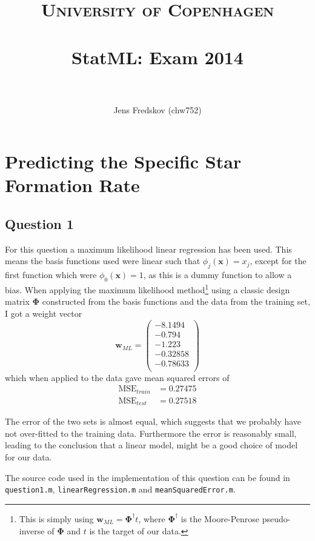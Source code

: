 \documentclass[a4paper, 11pt]{article}
\title{ 
\normalfont\normalsize 
\textsc{University of Copenhagen} \\ [25pt]
\horrule{0.5pt} \\[0.4cm]
\huge StatML\@: Exam 2014\\
\horrule{2pt} \\[0.5cm]
}
\author{Jens Fredskov (chw752)}
\begin{document}
\maketitle
\pagebreak

\section{Predicting the Specific Star Formation Rate} %
\label{sec:predicting_the_specific_star_formation_rate}

\subsection*{Question 1}
For this question a maximum likelihood linear regression has been used. This means the basis functions used were linear such that $\phi_j(\mathbf{x}) = x_j$, except for the first function which were $\phi_0(\mathbf{x}) = 1$, as this is a dummy function to allow a bias. When applying the maximum likelihood method\footnote{This is simply using $\mathbf{w}_{\mathit{ML}} = \bm\Phi^\dagger t$, where $\bm\Phi^\dagger$ is the Moore-Penrose pseudo-inverse of $\bm\Phi$ and $t$ is the target of our data.} using a classic design matrix $\bm\Phi$ constructed from the basis functions and the data from the training set, I got a weight vector
\[
    \mathbf{w}_{\mathit{ML}} = \begin{pmatrix}
      -8.1494 \\
       -0.794 \\
       -1.223 \\
     -0.32858 \\
     -0.78633 \\
    \end{pmatrix}
    \label{eq:wml}
\]
which when applied to the data gave mean squared errors of
\begin{align*}
    \mathrm{MSE}_{\mathit{train}} &= 0.27475 \\
    \mathrm{MSE}_{\mathit{test}} &= 0.27518
\end{align*}

The error of the two sets is almost equal, which suggests that we probably have not over-fitted to the training data. Furthermore the error is reasonably small, leading to the conclusion that a linear model, might be a good choice of model for our data.

The source code used in the implementation of this question can be found in \texttt{question1.m}, \texttt{linearRegression.m} and \texttt{meanSquaredError.m}.
\end{document}

